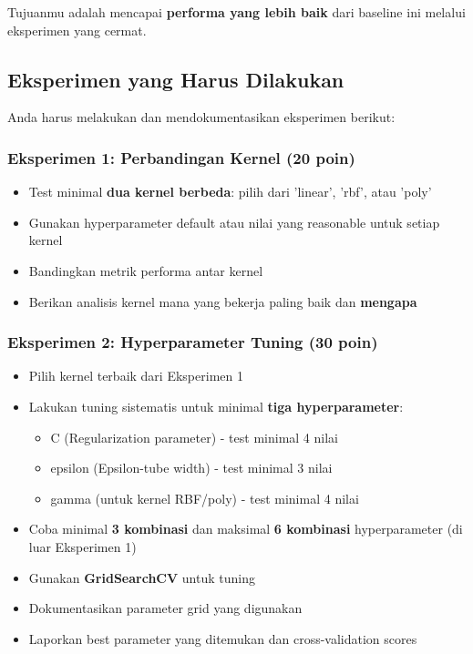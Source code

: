 \documentclass[12pt,a4paper]{article}
\begin{document}
Tujuanmu adalah mencapai \textbf{performa yang lebih baik} dari baseline ini melalui eksperimen yang cermat.

\subsection{Eksperimen yang Harus Dilakukan}

Anda harus melakukan dan mendokumentasikan eksperimen berikut:

\subsubsection{Eksperimen 1: Perbandingan Kernel (20 poin)}
\begin{itemize}
    \item Test minimal \textbf{dua kernel berbeda}: pilih dari 'linear', 'rbf', atau 'poly'
    \item Gunakan hyperparameter default atau nilai yang reasonable untuk setiap kernel
    \item Bandingkan metrik performa antar kernel
    \item Berikan analisis kernel mana yang bekerja paling baik dan \textbf{mengapa}
\end{itemize}

\subsubsection{Eksperimen 2: Hyperparameter Tuning (30 poin)}
\begin{itemize}
    \item Pilih kernel terbaik dari Eksperimen 1
    \item Lakukan tuning sistematis untuk minimal \textbf{tiga hyperparameter}:
    \begin{itemize}
        \item C (Regularization parameter) - test minimal 4 nilai
        \item epsilon (Epsilon-tube width) - test minimal 3 nilai
        \item gamma (untuk kernel RBF/poly) - test minimal 4 nilai
    \end{itemize}
    \item Coba minimal \textbf{3 kombinasi} dan maksimal \textbf{6 kombinasi} hyperparameter (di luar Eksperimen 1)
    \item Gunakan \textbf{GridSearchCV} untuk tuning
    \item Dokumentasikan parameter grid yang digunakan
    \item Laporkan best parameter yang ditemukan dan cross-validation scores
\end{itemize}
\end{document}
